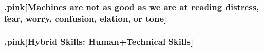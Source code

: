 \documentclass[]{tufte-handout}
\begin{document}
\hypertarget{pinkmachines-are-not-as-good-as-we-are-at-reading-distress-fear-worry-confusion-elation-or-tone}{%
\subsubsection{.pink{[}Machines are not as good as we are at reading
distress, fear, worry, confusion, elation, or
tone{]}}\label{pinkmachines-are-not-as-good-as-we-are-at-reading-distress-fear-worry-confusion-elation-or-tone}}

\hypertarget{pinkhybrid-skills-humantechnical-skills}{%
\subsubsection{.pink{[}Hybrid Skills: Human+Technical
Skills{]}}\label{pinkhybrid-skills-humantechnical-skills}}
\end{document}
